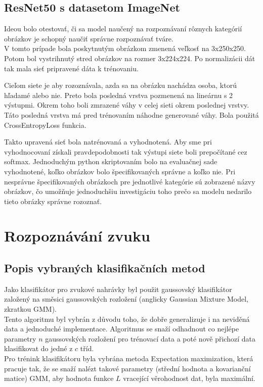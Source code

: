 \documentclass{article}
\begin{document}
\subsection{ResNet50 s datasetom ImageNet}
Ideou bolo otestovať, či sa model naučený na rozpoznávaní rôznych kategórií obrázkov je schopný naučiť správne rozpoznávať tváre.\\

V tomto prípade bola poskytnutým obrázkom zmenená veľkosť na 3x250x250. Potom bol vystrihnutý stred obrázkov na rozmer 3x224x224. Po normalizácii dát tak mala sieť pripravené dáta k trénovaniu.

Cieľom siete je aby rozoznávala, azda sa na obrázku nachádza osoba, ktorú hľadamé alebo nie. Preto bola posledná vrstva pozmenená na lineárnu s 2 výstupmi. Okrem toho boli zmrazené váhy v celej sieti okrem poslednej vrstvy. Táto posledná vrstva má pred trénovaním náhodne generované váhy. Bola použitá CrossEntropyLoss funkcia.

Takto upravená sieť bola natrénovaná a vyhodnotená. Aby sme pri vyhodnocovaní získali pravdepodobnosti tak výstupi siete boli prepočítané cez softmax. Jednoduchým python skriptovaním bolo na evaluačnej sade vyhodnotené, koľko obrázkov bolo špecifikovaných správne a koľko nie. Pri nesprávne špecifikovaných obrázkoch pre jednotlivé kategórie sú zobrazené názvy obrázkov, čo umožňuje jednoduchšiu investigáciu toho prečo sa modelu nedarilo tieto obrázky správne rozoznať.


\section{Rozpoznávání zvuku}

\subsection{Popis vybraných klasifikačních metod}
Jako klasifikátor pro zvukové nahrávky byl použit gaussovský klasifikátor založený na směsici gaussovských rozložení (anglicky Gaussian Mixture Model, zkratkou GMM).\\
Tento algoritmu byl vybrán z důvodu toho, že dobře generalizuje i na neviděná data a jednoduché implementace. Algoritmus se snaží odhadnout co nejlépe parametry $n$ gaussovských rozložení pro trénovací data a poté nově přichozí data klasifikovat do jedné z $c$ tříd.\\
Pro trénink klasifikátoru byla vybrána metoda Expectation maximization, která pracuje tak, že se snaží nalézt takové parametry (střední hodnota a kovarianční matice) GMM, aby hodnota funkce $L$ vracející věrohodnost dat, byla maximální.\\
\end{document}
